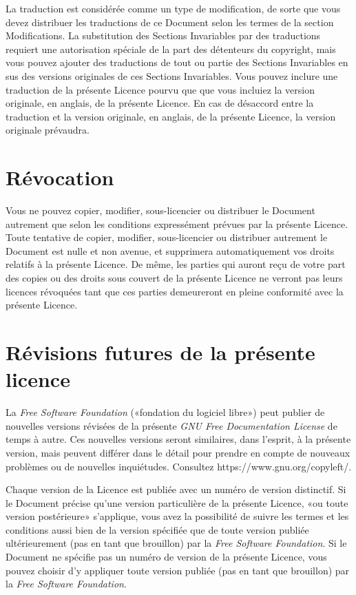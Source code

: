 La traduction est considérée comme un type de modification,
de sorte que vous devez distribuer les traductions de ce Document
selon les termes de la section Modifications. La substitution des
Sections Invariables par des traductions requiert une autorisation
spéciale de la part des détenteurs du copyright, mais vous pouvez
ajouter des traductions de tout ou partie des Sections Invariables
en sus des versions originales de ces Sections Invariables. Vous pouvez
inclure une traduction de la présente Licence pourvu que que vous
incluiez la version originale, en anglais, de la présente Licence.
En cas de désaccord entre la traduction et la version originale, en
anglais, de la présente Licence, la version originale prévaudra. 


\section{Révocation} 

Vous ne pouvez copier, modifier, sous-licencier ou distribuer
le Document autrement que selon les conditions expressément prévues
par la présente Licence. Toute tentative de copier, modifier, sous-licencier
ou distribuer autrement le Document est nulle et non avenue, et supprimera
automatiquement vos droits relatifs à la présente Licence. De même,
les parties qui auront reçu de votre part des copies ou des droits
sous couvert de la présente Licence ne verront pas leurs licences
révoquées tant que ces parties demeureront en pleine conformité avec
la présente Licence. 


\section{Révisions futures de la présente licence} 

La \emph{Free Software Foundation} («fondation du logiciel
libre») peut publier de nouvelles versions révisées de la présente
\emph{GNU Free Documentation License} de temps à autre. Ces nouvelles
versions seront similaires, dans l'esprit, à la présente version,
mais peuvent différer dans le détail pour prendre en compte de nouveaux
problèmes ou de nouvelles inquiétudes. Consultez https://www.gnu.org/copyleft/.

Chaque version de la Licence est publiée avec un numéro
de version distinctif. Si le Document précise qu'une version particulière
de la présente Licence, «ou toute version postérieure» s'applique,
vous avez la possibilité de suivre les termes et les conditions aussi
bien de la version spécifiée que de toute version publiée ultérieurement
(pas en tant que brouillon) par la \emph{Free Software Foundation}.
Si le Document ne spécifie pas un numéro de version de la présente
Licence, vous pouvez choisir d'y appliquer toute version publiée (pas
en tant que brouillon) par la \emph{Free Software Foundation}. 


